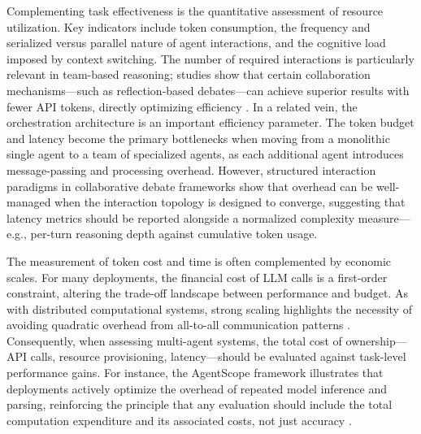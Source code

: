 \documentclass[11pt,a4paper]{article}
\begin{document}
Complementing task effectiveness is the quantitative assessment of resource utilization. Key indicators include token consumption, the frequency and serialized versus parallel nature of agent interactions, and the cognitive load imposed by context switching. The number of required interactions is particularly relevant in team-based reasoning; studies show that certain collaboration mechanisms---such as reflection-based debates---can achieve superior results with fewer API tokens, directly optimizing efficiency \cite{arxiv:2310.02124v2}. In a related vein, the orchestration architecture is an important efficiency parameter. The token budget and latency become the primary bottlenecks when moving from a monolithic single agent to a team of specialized agents, as each additional agent introduces message-passing and processing overhead. However, structured interaction paradigms in collaborative debate frameworks \cite{arxiv:2308.07201v1} show that overhead can be well-managed when the interaction topology is designed to converge, suggesting that latency metrics should be reported alongside a normalized complexity measure---e.g., per-turn reasoning depth against cumulative token usage.

The measurement of token cost and time is often complemented by economic scales. For many deployments, the financial cost of LLM calls is a first-order constraint, altering the trade-off landscape between performance and budget. As with distributed computational systems, strong scaling highlights the necessity of avoiding quadratic overhead from all-to-all communication patterns \cite{arxiv:1503.07220v2}. Consequently, when assessing multi-agent systems, the total cost of ownership---API calls, resource provisioning, latency---should be evaluated against task-level performance gains. For instance, the AgentScope framework illustrates that deployments actively optimize the overhead of repeated model inference and parsing, reinforcing the principle that any evaluation should include the total computation expenditure and its associated costs, not just accuracy \cite{arxiv:2402.14034v1}.
\end{document}
